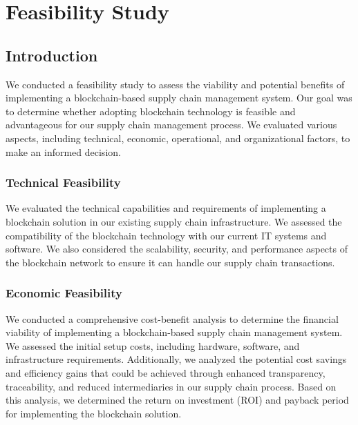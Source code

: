 
\chapter{Feasibility Study}\doublespacing %

\label{Chapter3} %



\section{Introduction}
We conducted a feasibility study to assess the viability and potential benefits of implementing a blockchain-based supply chain management system. Our goal was to determine whether adopting blockchain technology is feasible and advantageous for our supply chain management process. We evaluated various aspects, including technical, economic, operational, and organizational factors, to make an informed decision. 



\subsection{Technical Feasibility}
\noindent We evaluated the technical capabilities and requirements of implementing a blockchain solution in our existing supply chain infrastructure. We assessed the compatibility of the blockchain technology with our current IT systems and software. We also considered the scalability, security, and performance aspects of the blockchain network to ensure it can handle our supply chain transactions.



\subsection{Economic Feasibility}
\noindent We conducted a comprehensive cost-benefit analysis to determine the financial viability of implementing a blockchain-based supply chain management system. We assessed the initial setup costs, including hardware, software, and infrastructure requirements. Additionally, we analyzed the potential cost savings and efficiency gains that could be achieved through enhanced transparency, traceability, and reduced intermediaries in our supply chain process. Based on this analysis, we determined the return on investment (ROI) and payback period for implementing the blockchain solution. 

